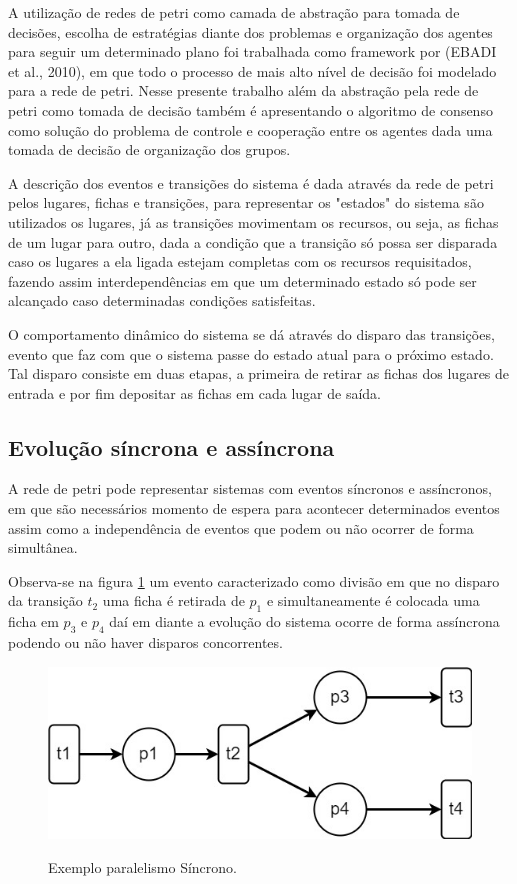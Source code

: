 A utilização de redes de petri como camada de abstração para tomada de decisões, escolha de estratégias diante dos problemas e organização dos agentes para seguir um determinado plano foi trabalhada como framework por (EBADI et al., 2010), em que todo o processo de mais alto nível de decisão foi modelado para a rede de petri. Nesse presente trabalho além da abstração pela rede de petri como tomada de decisão também é apresentando o algoritmo de consenso como solução do problema de controle e cooperação entre os agentes dada uma tomada de decisão de organização dos grupos.

A descrição dos eventos e transições do sistema é dada através da rede de petri pelos lugares, fichas e transições, para representar os "estados" do sistema são utilizados os lugares, já as transições movimentam os recursos, ou seja, as fichas de um lugar para outro, dada a condição que a transição só possa ser disparada caso os lugares a ela ligada estejam completas com os recursos requisitados, fazendo assim interdependências em que um determinado estado só pode ser alcançado caso determinadas condições satisfeitas.

O comportamento dinâmico do sistema se dá através do disparo das transições, evento que faz com que o sistema passe do estado atual para o próximo estado. Tal disparo consiste em duas etapas, a primeira de retirar as fichas dos lugares de entrada e por fim depositar as fichas em cada lugar de saída.

\subsection{Evolução síncrona e assíncrona}
A rede de petri pode representar sistemas com eventos síncronos e assíncronos, em que são necessários momento de espera para acontecer determinados eventos assim como a independência de eventos que podem ou não ocorrer de forma simultânea.

Observa-se na figura \ref{fig:paralelismo_sincrono} um evento caracterizado como divisão em que no disparo da transição $t_2$ uma ficha é retirada de $p_1$ e simultaneamente é colocada uma ficha em $p_3$ e $p_4$ daí em diante a evolução do sistema ocorre de forma assíncrona podendo ou não haver disparos concorrentes.  

\begin{figure}[ht]
    \centering
    \caption{Exemplo paralelismo Síncrono.}
    \includegraphics[scale=0.4]{figures/Petri/paralelismo_sincrono.jpg}
    \label{fig:paralelismo_sincrono}
\end{figure}

